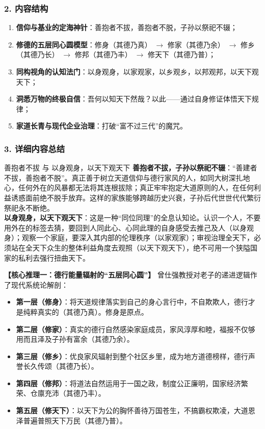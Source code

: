 \subsubsection{2. 内容结构}
\begin{enumerate}
    \item \textbf{信仰与基业的定海神针}：善抱者不拔，善抱者不脱，子孙以祭祀不辍；
    \item \textbf{修德的五层同心圆模型}：修身（其德乃真） $\rightarrow$ 修家（其德乃余） $\rightarrow$ 修乡（其德乃长） $\rightarrow$ 修邦（其德乃丰） $\rightarrow$ 修天下（其德乃普）；
    \item \textbf{同构视角的认知法门}：以身观身，以家观家，以乡观乡，以邦观邦，以天下观天下；
    \item \textbf{洞悉万物的终极自信}：吾何以知天下然哉？以此——通过自身修证体悟天下规律；
    \item \textbf{家道长青与现代企业治理}：打破“富不过三代”的魔咒。
\end{enumerate}

\subsubsection{3. 详细内容总结}

\begin{ConceptBox}{善抱者不拔 与 以身观身，以天下观天下}
\textbf{善抱者不拔，子孙以祭祀不辍}：“善建者不拔，善抱者不脱”。真正善于树立天道信仰与德行家风的人，如同大树深扎地心，任何外在的风暴都无法将其连根拔除；真正牢牢抱定大道原则的人，在任何利益诱惑面前绝不脱手放弃。这样的家族能够跨越历史兴衰，子孙后代世世代代繁衍祭祀永不断绝。\\
\textbf{以身观身，以天下观天下}：这是一种“同位同理”的全息认知论。认识一个人，不要用外在的标签去猜，要回到人同此心、心同此理的自身感受去推己及人（以身观身）；观察一个家庭，要深入其内部的伦理秩序（以家观家）；审视治理全天下，必须站在全天下众生的整体利益角度去观照（以天下观天下），绝不可用一个狭隘国家的私利去强行扭曲天下。
\end{ConceptBox}

\noindent\textbf{【核心推理一：德行能量辐射的“五层同心圆”】}
曾仕强教授对老子的递进逻辑作了现代系统论解剖：
\begin{itemize}
    \item \textbf{第一层（修身）}：将天道规律落实到自己的身心言行中，不自欺欺人，德行才是纯粹真实的（其德乃真）。修身是原点。
    \item \textbf{第二层（修家）}：真实的德行自然感染家庭成员，家风淳厚和睦，福报不仅够用而且泽及子孙有富余（其德乃余）。
    \item \textbf{第三层（修乡）}：优良家风辐射到整个社区乡里，成为地方道德榜样，德行声誉长久传颂（其德乃长）。
    \item \textbf{第四层（修邦）}：将道法自然运用于一国之政，制度公正廉明，国家经济繁荣、仓廪充沛（其德乃丰）。
    \item \textbf{第五层（修天下）}：以天下为公的胸怀善待万国苍生，不搞霸权欺凌，大道恩泽普遍普照天下万民（其德乃普）。
\end{itemize}

